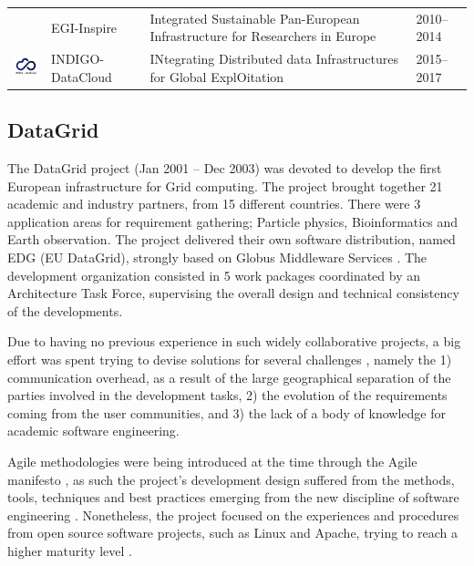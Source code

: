 \documentclass[journal]{IEEEtran}
\begin{document}
\begin{table}[!h]
\begin{tabular}{p{1.6cm}p{1.5cm}p{3cm}l}
\begin{minipage}{.3\textwidth}
\end{minipage}
     & EGI-Inspire &
Integrated Sustainable Pan-European Infrastructure for Researchers in Europe
 & 2010--2014\\
\begin{minipage}{.3\textwidth}
\includegraphics[width=15mm,height=7.5mm]{images/indigo}
\end{minipage}
     & INDIGO-DataCloud &
INtegrating Distributed data Infrastructures for Global ExplOitation
 & 2015--2017\\
\hline
\hline
\end{tabular}
\end{table}



\subsection{DataGrid}

The DataGrid \cite{cordis:datagrid} project (Jan 2001 -- Dec 2003) was devoted
to develop the first European infrastructure for Grid computing. The project
brought together 21 academic and industry partners, from 15 different
countries. There were 3 application areas for requirement gathering;
Particle physics, Bioinformatics and Earth observation. The project delivered
their own software distribution, named EDG (EU DataGrid), strongly based on
Globus Middleware Services \cite{globus}. The development organization
consisted in 5 work packages coordinated by an Architecture Task Force,
supervising the overall design and technical consistency of the developments.

Due to having no previous experience in such widely
collaborative projects, a big effort was spent trying to devise solutions for several
challenges \cite{datagrid}, namely the 1) communication overhead, as a
result of the large geographical separation of the parties involved in the
development tasks, 2) the evolution of the requirements coming from the user
communities, and 3) the lack of a body of knowledge for academic software
engineering.

Agile methodologies were being introduced at the time
through the Agile manifesto \cite{agile-manifesto}, as such the project's
development design suffered from the methods, tools, techniques and best
practices emerging from the new discipline of software engineering
\cite{agile}. Nonetheless, the project focused on the experiences and procedures
from open source software projects, such as Linux and Apache, trying to reach a
higher maturity level \cite{cmm}.
\end{document}
